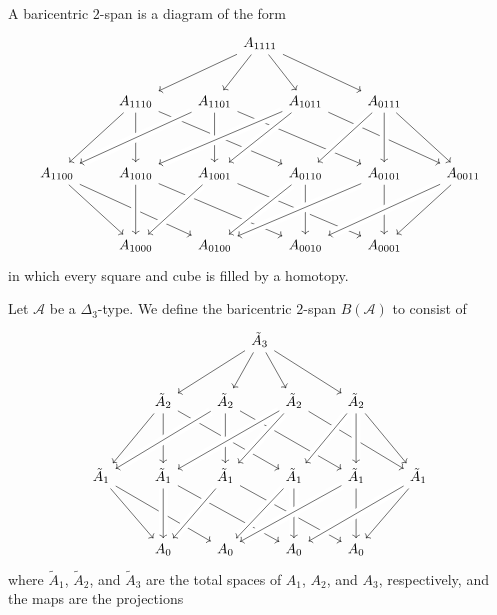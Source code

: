 \begin{defn}
A baricentric $2$-span is a diagram of the form
\begin{equation*}
\begin{tikzcd}[column sep=small,row sep=huge]
& & & & &[-1.2em] A_{1111} \arrow[dlll] \arrow[dl] \arrow[dr] \arrow[drrr] &[-1.2em] \\[-1em]
& & A_{1110} \arrow[dll] \arrow[d] \arrow[drrrr] & & A_{1101} \arrow[dllll,crossing over] \arrow[d,crossing over] \arrow[drrrr] & & A_{1011} \arrow[dllll,crossing over] \arrow[dll,crossing over] \arrow[drrrr] & & A_{0111} \arrow[dll,crossing over] \arrow[d,crossing over] \arrow[drr] \\
A_{1100} \arrow[drr] \arrow[drrrr] & & A_{1010} \arrow[d,crossing over] \arrow[drrrr] & & A_{1001} \arrow[dll,crossing over] \arrow[drrrr] & & A_{0110} \arrow[dll,crossing over] \arrow[d,crossing over] & & A_{0101} \arrow[dllll,crossing over] \arrow[d] & & A_{0011} \arrow[dllll,crossing over] \arrow[dll] \\
& & A_{1000} & & A_{0100} & & A_{0010} & & A_{0001}
\end{tikzcd}
\end{equation*}
in which every square and cube is filled by a homotopy.
\end{defn}

\begin{defn}
Let $\mathcal{A}$ be a $\Delta_3$-type. We define the baricentric $2$-span $B(\mathcal{A})$ to consist of
\begin{equation*}
\begin{tikzcd}[column sep=small,row sep=huge]
& & & & &[-.8em] \tilde A_3 \arrow[dlll] \arrow[dl] \arrow[dr] \arrow[drrr] &[-.8em] \\[-1em]
& & \tilde A_2 \arrow[dll] \arrow[d] \arrow[drrrr] & & \tilde A_2 \arrow[dllll,crossing over] \arrow[d,crossing over] \arrow[drrrr] & & \tilde A_2 \arrow[dllll,crossing over] \arrow[dll,crossing over] \arrow[drrrr] & & \tilde A_2 \arrow[dll,crossing over] \arrow[d,crossing over] \arrow[drr] \\
\tilde A_1 \arrow[drr] \arrow[drrrr] & & \tilde A_1 \arrow[d,crossing over] \arrow[drrrr] & & \tilde A_1 \arrow[dll,crossing over] \arrow[drrrr] & & \tilde A_1 \arrow[dll,crossing over] \arrow[d,crossing over] & & \tilde A_1 \arrow[dllll,crossing over] \arrow[d] & & \tilde A_1 \arrow[dllll,crossing over] \arrow[dll] \\
& & A_0 & & A_0 & & A_0 & & A_0
\end{tikzcd}
\end{equation*}
where $\tilde A_1$, $\tilde A_2$, and $\tilde A_3$ are the total spaces of $A_1$, $A_2$, and $A_3$, respectively, and the maps are the projections
\end{defn}

